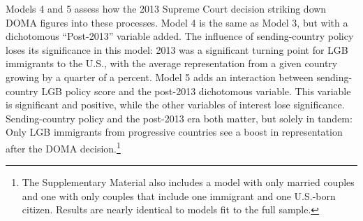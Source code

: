 \documentclass[
  11pt,
]{article}
\begin{document}
Models 4 and 5 assess how the 2013 Supreme Court decision striking down DOMA figures into these processes. Model 4 is the same as Model 3, but with a dichotomous ``Post-2013'' variable added. The influence of sending-country policy loses its significance in this model: 2013 was a significant turning point for LGB immigrants to the U.S., with the average representation from a given country growing by a quarter of a percent. Model 5 adds an interaction between sending-country LGB policy score and the post-2013 dichotomous variable. This variable is significant and positive, while the other variables of interest lose significance. Sending-country policy and the post-2013 era both matter, but solely in tandem: Only LGB immigrants from progressive countries see a boost in representation after the DOMA decision.\footnote{The Supplementary Material also includes a model with only married couples and one with only couples that include one immigrant and one U.S.-born citizen. Results are nearly identical to models fit to the full sample.}
\end{document}
